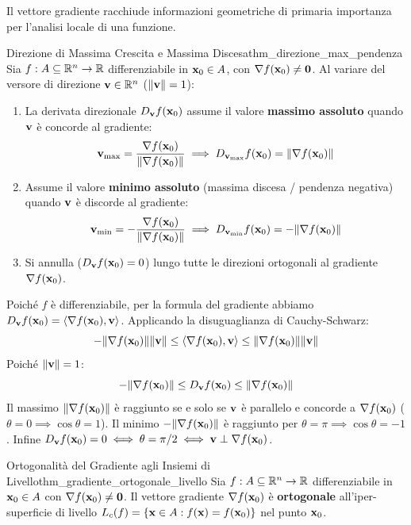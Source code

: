 Il vettore gradiente racchiude informazioni geometriche di primaria importanza per l'analisi locale di una funzione.

\begin{teorema}{Direzione di Massima Crescita e Massima Discesa}{thm_direzione_max_pendenza}
Sia $f: A \subseteq \mathbb{R}^n \to \mathbb{R}$ differenziabile in $\mathbf{x}_0 \in A$, con $\nabla f(\mathbf{x}_0) \neq \mathbf{0}$.
Al variare del versore di direzione $\mathbf{v} \in \mathbb{R}^n$ ($\lVert\mathbf{v}\rVert = 1$):
\begin{enumerate}
    \item La derivata direzionale $D_{\mathbf{v}} f(\mathbf{x}_0)$ assume il valore \textbf{massimo assoluto} quando $\mathbf{v}$ è concorde al gradiente:
    \[
    \mathbf{v}_{\max} = \frac{\nabla f(\mathbf{x}_0)}{\lVert\nabla f(\mathbf{x}_0)\rVert} \implies D_{\mathbf{v}_{\max}} f(\mathbf{x}_0) = \lVert\nabla f(\mathbf{x}_0)\rVert
    \]
    \item Assume il valore \textbf{minimo assoluto} (massima discesa / pendenza negativa) quando $\mathbf{v}$ è discorde al gradiente:
    \[
    \mathbf{v}_{\min} = -\frac{\nabla f(\mathbf{x}_0)}{\lVert\nabla f(\mathbf{x}_0)\rVert} \implies D_{\mathbf{v}_{\min}} f(\mathbf{x}_0) = -\lVert\nabla f(\mathbf{x}_0)\rVert
    \]
    \item Si annulla ($D_{\mathbf{v}} f(\mathbf{x}_0) = 0$) lungo tutte le direzioni ortogonali al gradiente $\nabla f(\mathbf{x}_0)$.
\end{enumerate}
\end{teorema}

\begin{dimostrazione}
Poiché $f$ è differenziabile, per la formula del gradiente abbiamo $D_{\mathbf{v}} f(\mathbf{x}_0) = \langle\nabla f(\mathbf{x}_0), \mathbf{v}\rangle$.
Applicando la disuguaglianza di Cauchy-Schwarz:
\[
-\lVert\nabla f(\mathbf{x}_0)\rVert \lVert\mathbf{v}\rVert \le \langle\nabla f(\mathbf{x}_0), \mathbf{v}\rangle \le \lVert\nabla f(\mathbf{x}_0)\rVert \lVert\mathbf{v}\rVert
\]
Poiché $\lVert\mathbf{v}\rVert = 1$:
\[
-\lVert\nabla f(\mathbf{x}_0)\rVert \le D_{\mathbf{v}} f(\mathbf{x}_0) \le \lVert\nabla f(\mathbf{x}_0)\rVert
\]
Il massimo $\lVert\nabla f(\mathbf{x}_0)\rVert$ è raggiunto se e solo se $\mathbf{v}$ è parallelo e concorde a $\nabla f(\mathbf{x}_0)$ ($\theta = 0 \implies \cos\theta = 1$). Il minimo $-\lVert\nabla f(\mathbf{x}_0)\rVert$ è raggiunto per $\theta = \pi \implies \cos\theta = -1$. Infine $D_{\mathbf{v}} f(\mathbf{x}_0) = 0 \iff \theta = \pi/2 \iff \mathbf{v} \perp \nabla f(\mathbf{x}_0)$.
\end{dimostrazione}

\begin{teorema}{Ortogonalità del Gradiente agli Insiemi di Livello}{thm_gradiente_ortogonale_livello}
Sia $f: A \subseteq \mathbb{R}^n \to \mathbb{R}$ differenziabile in $\mathbf{x}_0 \in A$ con $\nabla f(\mathbf{x}_0) \neq \mathbf{0}$.
Il vettore gradiente $\nabla f(\mathbf{x}_0)$ è \textbf{ortogonale} all'iper-superficie di livello $L_c(f) = \{\mathbf{x} \in A : f(\mathbf{x}) = f(\mathbf{x}_0)\}$ nel punto $\mathbf{x}_0$.
\end{teorema}

